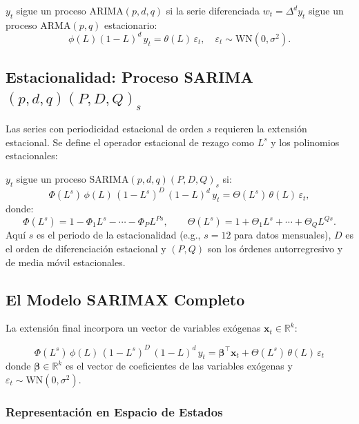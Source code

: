 \documentclass[12pt, letterpaper]{article}
\begin{document}
\begin{definicion}
$y_t$ sigue un proceso ARIMA$(p,d,q)$ si la serie diferenciada $w_t = \Delta^d y_t$ sigue un proceso ARMA$(p,q)$ estacionario:
\[
  \phi(L)(1-L)^d\,y_t = \theta(L)\,\varepsilon_t, \quad \varepsilon_t \sim \text{WN}(0,\sigma^2).
\]
\end{definicion}

\subsection{Estacionalidad: Proceso SARIMA$(p,d,q)(P,D,Q)_s$}

Las series con periodicidad estacional de orden $s$ requieren la extensión estacional. Se define el operador estacional de rezago como $L^s$ y los polinomios estacionales:

\begin{definicion}
$y_t$ sigue un proceso SARIMA$(p,d,q)(P,D,Q)_s$ si:
\[
  \Phi(L^s)\,\phi(L)\,(1-L^s)^D\,(1-L)^d\,y_t = \Theta(L^s)\,\theta(L)\,\varepsilon_t,
\]
donde:
\[
  \Phi(L^s) = 1 - \Phi_1 L^s - \cdots - \Phi_P L^{Ps}, \qquad
  \Theta(L^s) = 1 + \Theta_1 L^s + \cdots + \Theta_Q L^{Qs}.
\]
Aquí $s$ es el periodo de la estacionalidad (e.g., $s=12$ para datos mensuales), $D$ es el orden de diferenciación estacional y $(P,Q)$ son los órdenes autorregresivo y de media móvil estacionales.
\end{definicion}

\subsection{El Modelo SARIMAX Completo}

La extensión final incorpora un vector de variables exógenas $\mathbf{x}_t \in \mathbb{R}^k$:

\begin{definicion}
\[
  \boxed{
  \Phi(L^s)\,\phi(L)\,(1-L^s)^D\,(1-L)^d\,y_t
  = \boldsymbol{\beta}^\top \mathbf{x}_t + \Theta(L^s)\,\theta(L)\,\varepsilon_t
  }
\]
donde $\boldsymbol{\beta} \in \mathbb{R}^k$ es el vector de coeficientes de las variables exógenas y $\varepsilon_t \sim \text{WN}(0,\sigma^2)$.
\end{definicion}

\subsubsection{Representación en Espacio de Estados}
\end{document}
